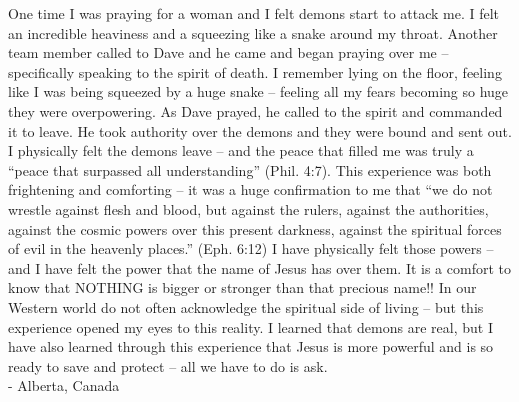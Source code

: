 \documentclass[oneside]{book}
\begin{document}
One time I was praying for a woman and I felt demons start to attack me. I felt an incredible heaviness and a squeezing like a snake around my throat. Another team member called to Dave and he came and began praying over me – specifically speaking to the spirit of death. I remember lying on the floor, feeling like I was being squeezed by a huge snake – feeling all my fears becoming so huge they were overpowering. As Dave prayed, he called to the spirit and commanded it to leave. He took authority over the demons and they were bound and sent out. I physically felt the demons leave – and the peace that filled me was truly a “peace that surpassed all understanding” (Phil. 4:7).
This experience was both frightening and comforting – it was a huge confirmation to me that “we do not wrestle against flesh and blood, but against the rulers, against the authorities, against the cosmic powers over this present darkness, against the spiritual forces of evil in the heavenly places.” (Eph. 6:12)  I have physically felt those powers – and I have felt the power that the name of Jesus has over them. It is a comfort to know that NOTHING is bigger or stronger than that precious name!!
In our Western world do not often acknowledge the spiritual side of living – but this experience opened my eyes to this reality. I learned that demons are real, but I have also learned through this experience that Jesus is more powerful and is so ready to save and protect – all we have to do is ask. \\

- Alberta, Canada
\clearpage

\end{document}

